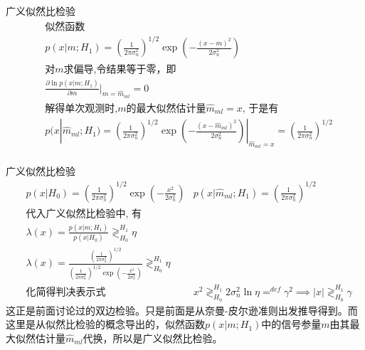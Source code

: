 \begin{frame}{广义似然比检验}
\begin{align*}
&\text{似然函数}\\
&p(x|m;H_1)=(\frac{1}{2\pi\sigma_n^2})^{1/2}\exp(-\frac{(x-m)^2}{2\sigma_n^2})\\
&\text{对$m$求偏导,令结果等于零，即} \\
&\frac{\partial\ln p(x|m;H_1)}{\partial m}|_{m=\widehat{m}_{ml}}=0\\
&\text{解得单次观测时,$m$的最大似然估计量$\widehat{m}_{ml}=x$, 于是有 }\\
&p(x|\widehat{m}_{ml};H_1)=(\frac{1}{2\pi\sigma_n^2})^{1/2}\exp(-\frac{(x-\widehat{m}_{ml})^2}{2\sigma_n^2})|_{\widehat{m}_{ml}=x}=(\frac{1}{2\pi\sigma_n^2})^{1/2}\\
\end{align*}
\end{frame}
\begin{frame}{广义似然比检验}
\begin{align*}
&p(x|H_0)=(\frac{1}{2\pi\sigma_n^2})^{1/2}\exp(-\frac{x^2}{2\sigma_n^2})
&p(x|\widehat{m}_{ml};H_1)=(\frac{1}{2\pi\sigma_n^2})^{1/2}\\
&\text{代入广义似然比检验中, 有}\\
&\lambda(x)=\frac{p(x|m; H_1)}{p(x|H_0)}\mathop{\gtrless}_{H_0}^{H_1}\eta\\
&\lambda(x)=\frac{(\frac{1}{2\pi\sigma_n^2})^{1/2}}{(\frac{1}{2\pi\sigma_n^2})^{1/2}\exp(-\frac{x^2}{2\sigma_n^2})}\mathop{\gtrless}_{H_0}^{H_1}\eta\\
&\text{化简得判决表示式}
&x^2\mathop{\gtrless}_{H_0}^{H_1}2\sigma_n^2\ln\eta\mathop{=}^{def}\gamma^2 \implies |x|\mathop{\gtrless}_{H_0}^{H_1}\gamma
\end{align*}
这正是前面讨论过的双边检验。只是前面是从奈曼-皮尔逊准则出发推导得到。而这里是从似然比检验的概念导出的，似然函数$p(x|m;H_1)$中的信号参量$m$由其最大似然估计量$\widehat{m}_{ml}$代换，所以是广义似然比检验。
\end{frame}


